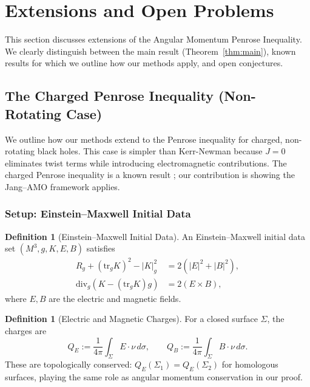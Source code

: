 \documentclass[12pt]{article}
\theoremstyle{plain}
\theoremstyle{definition}
\newtheorem{definition}[theorem]{Definition}
\theoremstyle{remark}
\newcommand{\tr}{\mathrm{tr}}
\newcommand{\Div}{\mathrm{div}}
\begin{document}

\section{Extensions and Open Problems}\label{sec:extensions}

This section discusses extensions of the Angular Momentum Penrose Inequality. We clearly distinguish between the main result (Theorem~\ref{thm:main}), known results for which we outline how our methods apply, and open conjectures.

\subsection{The Charged Penrose Inequality (Non-Rotating Case)}\label{subsec:charged-penrose}

We outline how our methods extend to the Penrose inequality for charged, non-rotating black holes. This case is simpler than Kerr-Newman because $J = 0$ eliminates twist terms while introducing electromagnetic contributions. The charged Penrose inequality is a known result \cite{mars2009, khuri2015charged}; our contribution is showing the Jang--AMO framework applies.

\subsubsection{Setup: Einstein--Maxwell Initial Data}

\begin{definition}[Einstein--Maxwell Initial Data]
An Einstein--Maxwell initial data set $(M^3, g, K, E, B)$ satisfies
\begin{align}
    R_g + (\tr_g K)^2 - |K|_g^2 &= 2(|E|^2 + |B|^2), \\
    \Div_g(K - (\tr_g K)g) &= 2(E \times B),
\end{align}
where $E, B$ are the electric and magnetic fields.
\end{definition}

\begin{definition}[Electric and Magnetic Charges]
For a closed surface $\Sigma$, the charges are
\[
Q_E := \frac{1}{4\pi}\int_\Sigma E \cdot \nu \, d\sigma, \qquad Q_B := \frac{1}{4\pi}\int_\Sigma B \cdot \nu \, d\sigma.
\]
These are topologically conserved: $Q_E(\Sigma_1) = Q_E(\Sigma_2)$ for homologous surfaces, playing the same role as angular momentum conservation in our proof.
\end{definition}
\end{document}
